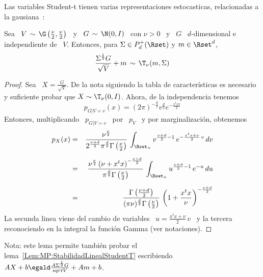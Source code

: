 Las   variables   Student-t   tienen   varias   representaciones   estocasticas,
relacionadas a la gausiana~\cite{FanKot90, And03, KotNad04, AndKau65}:
%
\begin{lema}\label{Lem:MP:StudentTGamma}
%
  Sea \ $V \,  \sim \, \G\left( \frac{\nu}{2} , \frac{\nu}{2} \right)$  \ y \ $G
  \,  \sim  \, \N(0,I)$  \  con  $\nu >  0$  \  y \  $G$  \  $d$-dimensional e independiente de  \
  $V$. Entonces, para $\Sigma \in P_d^+(\Rset)$ y $m \in \Rset^d$,
  \[
  \frac{\Sigma^{\frac12} G}{\sqrt{V}} + m  \, \sim \, \T_\nu(m,\Sigma)
  \]
\end{lema}
\begin{proof}
  Sea \ $X = \frac{G}{\sqrt{V}}$. De la nota siguiendo la tabla de caracter\'isticas
  es  necesario  y suficiente  probar  que $X  \sim  \T_\nu(0,I)$.  Ahora, de  la
  independencia tenemos
  \[
  p_{G|V=v}(x)  = (2  \pi)^{-\frac{d}{2}}  v^{\frac{d}{2}} e^{-  \frac{x^t x v}{2}}
  \]
  Entonces, multiplicando \ $p_{G|V=v}$ \ por \ $p_V$ \ y por marginalizaci\'on,
  obtenemos
  \begin{eqnarray*}
  p_X(x) & = & \frac{\nu^{\frac{\nu}{2}}}{2^{\frac{\nu+d}{2}} \pi^{\frac{d}{2}}
  \Gamma\left( \frac{\nu}{2} \right)} \, \int_{\Rset_+} v^{\frac{\nu+d}{2}-1} \,
  e^{- \frac{x^t x + \nu}{2} \, v} \, dv\\[2mm]
  & = & \frac{\nu^{\frac{\nu}{2}} \left( \nu + x^t x \right)^{-
  \frac{\nu+d}{2}}}{\pi^{\frac{d}{2}} \Gamma\left( \frac{\nu}{2} \right)} \,
  \int_{\Rset_+} u^{\frac{\nu+d}{2}-1} \, e^{- u} \, du\\[2mm]
  & = & \frac{\Gamma\left( \frac{\nu+d}{2} \right)}{(\pi \nu)^{\frac{d}{2}}
  \Gamma\left( \frac{\nu}{2} \right)} \, \left( 1 + \frac{x^t x}{\nu} \right)^{-
  \frac{\nu+d}{2}}
  \end{eqnarray*}
  La secunda linea viene del cambio de variables \ $u = \frac{x^t x + \nu}{2} \,
  v$  \  y la  tercera  reconociendo  en la  integral  la  funci\'on Gamma  (ver
  notaciones).
\end{proof}
%
Nota:       este       lema        permite       tambi\'en       probar       el
lema~\ref{Lem:MP:StabilidadLinealStudentT} escribiendo \ $A X + b \egald \frac{A
  \Sigma^{\frac12} G}{sqrt{V}} + A m + b$.

